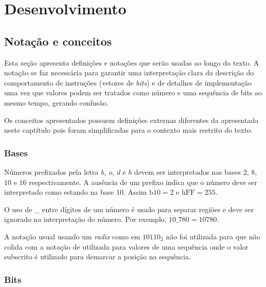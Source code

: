 
\chapter{Desenvolvimento}
\label{cap:2}

\section{Notação e conceitos}
\label{sec:not}

  Esta seção apresenta definições e notações que serão usadas ao longo do texto.
  A notação se faz necessária para garantir uma interpretação clara da descrição do
  comportamento de instruções (vetores de \emph{bits})
   e de detalhes de implementação uma vez que valores 
  podem ser tratados como número e uma sequência de bits ao mesmo tempo, gerando
  confusão.

  Os conceitos apresentados possuem definições externas diferentes da apresentada 
  neste captítulo pois foram simplificadas para o contexto mais restrito do texto.

\subsection{Bases}
\label{sec:bases}

  Números prefixados pela letra \emph{b}, \emph{o}, \emph{d} e \emph{h} devem ser 
  interpretados nas bases $2$, $8$, $10$ e $16$ respectivamente. A ausência de um 
  prefixo indica que o número deve ser interpretado como estando na base 10. Assim 
  $ \text{b}10 = 2 $ e $ \text{hFF} = 255 $. 
  
  O uso de \emph{\_} entre dígitos de um número é usado para separar regiões
  e deve ser ignorado na interpretação do número. Por exemplo, $ 10\_780 = 10780 $.

  A notação usual usando um \emph{radix} como em $10110_2$ não foi utilizada para 
  que não colida com a notação de utilizada para valores de uma sequência onde o valor
  subscrito é utilizado para demarcar a posição na sequência.

\subsection{Bits}
\label{sec:bit}

